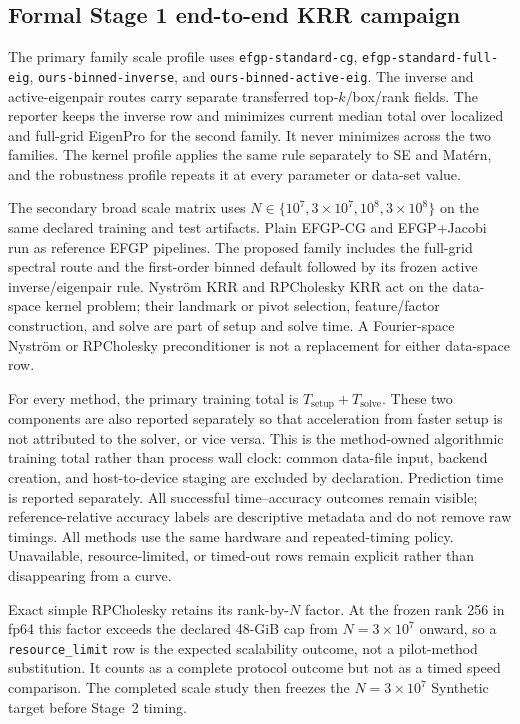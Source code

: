 \subsection{Formal Stage 1 end-to-end KRR campaign}

The primary family scale profile uses
\texttt{efgp-standard-cg}, \texttt{efgp-standard-full-eig},
\texttt{ours-binned-inverse}, and
\texttt{ours-binned-active-eig}.  The inverse and active-eigenpair routes
carry separate transferred top-$k$/box/rank fields.  The reporter keeps the
inverse row and minimizes current median total over localized and full-grid
EigenPro for the second family.  It never minimizes across the two families.
The kernel profile applies the same rule separately to SE and Mat\'ern, and
the robustness profile repeats it at every parameter or data-set value.

The secondary broad scale matrix uses
\(N\in\{10^7,3\times10^7,10^8,3\times10^8\}\) on the same declared training
and test artifacts.  Plain EFGP-CG and EFGP+Jacobi run as reference EFGP
pipelines.  The proposed family includes the full-grid spectral route and the
first-order binned default followed by its frozen active inverse/eigenpair
rule.  Nystr\"om
KRR and RPCholesky KRR act on the data-space kernel problem; their landmark or
pivot selection, feature/factor construction, and solve are part of setup and
solve time.  A Fourier-space Nystr\"om or RPCholesky preconditioner is not a
replacement for either data-space row.

For every method, the primary training total is
\(T_{\mathrm{setup}}+T_{\mathrm{solve}}\).  These two components are also
reported separately so that acceleration from faster setup is not attributed
to the solver, or vice versa.  This is the method-owned algorithmic training
total rather than process wall clock: common data-file input, backend creation,
and host-to-device staging are excluded by declaration.  Prediction time is
reported separately.  All successful time--accuracy outcomes remain visible;
reference-relative accuracy labels are descriptive metadata and do not remove
raw timings.  All methods use the same hardware and repeated-timing policy.
Unavailable, resource-limited, or timed-out rows remain explicit rather than
disappearing from a curve.

Exact simple RPCholesky retains its rank-by-\(N\) factor.  At the frozen rank
256 in fp64 this factor exceeds the declared 48-GiB cap from
\(N=3\times10^7\) onward, so a \texttt{resource\_limit} row is the expected
scalability outcome, not a pilot-method substitution.  It counts as a complete
protocol outcome but not as a timed speed comparison.  The completed scale
study then freezes the \(N=3\times10^7\) Synthetic target before Stage~2
timing.


